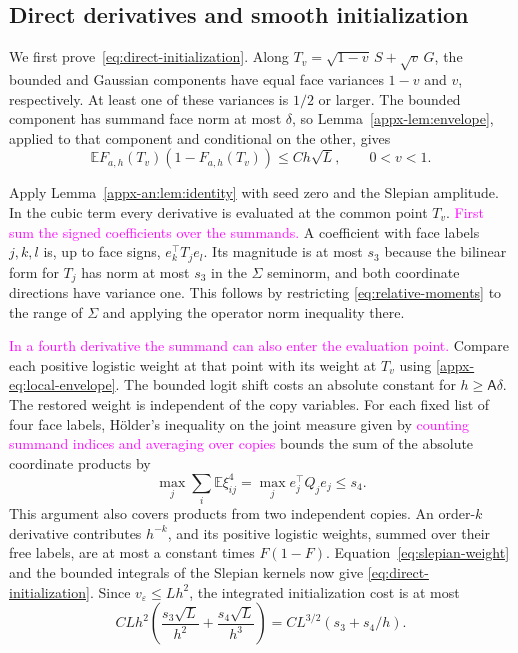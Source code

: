 \documentclass[11pt,letterpaper]{article}
\theoremstyle{remark}
\newcommand{\E}{\mathbb E}
\begin{document}
\subsection{Direct derivatives and smooth initialization}
\label{appx-an:sec:initialization}

We first prove~\eqref{eq:direct-initialization}. Along
\(T_v=\sqrt{1-v}\,S+\sqrt v\,G\), the bounded and Gaussian
components have equal face variances \(1-v\) and \(v\), respectively.
At least one of these variances is \(1/2\) or larger. The bounded
component has summand face
norm at most \(\delta\), so Lemma~\ref{appx-lem:envelope}, applied
to that component and conditional on the other, gives
\begin{equation}
 \E F_{a,h}(T_v)(1-F_{a,h}(T_v))\le Ch\sqrt L,
 \qquad 0<v<1.
 \label{eq:slepian-weight}
\end{equation}

Apply Lemma~\ref{appx-an:lem:identity} with seed zero and the Slepian amplitude. In the cubic term every derivative is evaluated at the common point $T_v$. \textcolor{magenta}{First sum the signed coefficients over the summands.} A coefficient with face labels $j,k,l$ is, up to face signs, $e_k^\top T_j e_l$. Its magnitude is at most $s_3$ because the bilinear form for $T_j$ has norm at most $s_3$ in the $\Sigma$ seminorm, and both coordinate directions have variance one. This follows by restricting \eqref{eq:relative-moments} to the range of $\Sigma$ and applying the operator norm inequality there.

\textcolor{magenta}{In a fourth derivative the summand can also enter the evaluation point.} Compare each positive logistic weight at that point with its weight at $T_v$ using \eqref{appx-eq:local-envelope}. The bounded logit shift costs an absolute constant for $h\ge\mathsf A\delta$. The restored weight is independent of the copy variables. For each fixed list of four face labels, H\"older's inequality on the joint measure given by \textcolor{magenta}{counting summand indices and averaging over copies} bounds the sum of the absolute coordinate products by
\[
 \max_j\sum_i\E\xi_{ij}^4=\max_j e_j^\top Q_j e_j\le s_4.
\]
This argument also covers products from two independent copies. An order-$k$ derivative contributes $h^{-k}$, and its positive logistic weights, summed over their free labels, are at most a constant times $F(1-F)$. Equation~\eqref{eq:slepian-weight} and the bounded integrals of the Slepian kernels now give \eqref{eq:direct-initialization}. Since $v_\varepsilon\le Lh^2$, the integrated initialization cost is at most
\[
 C Lh^2\left(\frac{s_3\sqrt L}{h^2}+\frac{s_4\sqrt L}{h^3}\right)
 = C L^{3/2}(s_3+s_4/h).
\]
\end{document}

